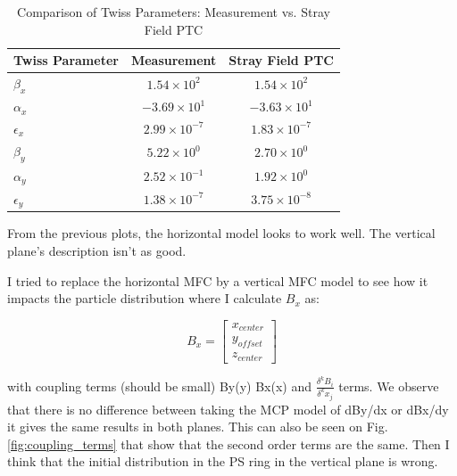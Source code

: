 \begin{table}[ht]
    \centering
    \caption{Comparison of Twiss Parameters: Measurement vs. Stray Field PTC}
    \begin{tabular}{l c c}
        \hline
        \textbf{Twiss Parameter} & \textbf{Measurement} & \textbf{Stray Field PTC} \\
        \hline
        $\beta_x$ & $1.54 \times 10^2$ & $1.54 \times 10^2$ \\
        $\alpha_x$ & $-3.69 \times 10^1$ & $-3.63 \times 10^1$ \\
        $\epsilon_x$ & $2.99 \times 10^{-7}$ & $1.83 \times 10^{-7}$ \\
        \hline
        $\beta_y$ & $5.22 \times 10^0$ & $2.70 \times 10^0$ \\
        $\alpha_y$ & $2.52 \times 10^{-1}$ & $1.92 \times 10^0$ \\
        $\epsilon_y$ & $1.38 \times 10^{-7}$ & $3.75 \times 10^{-8}$ \\
        \hline
    \end{tabular}
    \label{tab:twiss_comparison_measurement_ptc}
\end{table}

From the previous plots, the horizontal model looks to work well. The vertical plane's description isn't as good.

I tried to replace the horizontal MFC by a vertical MFC model to see how it impacts the particle distribution where I calculate $B_{x}$ as:

$$ B_{x} = \begin{bmatrix}  
x_{center} \\  
y_{offset}\\
z_{center} \end{bmatrix} $$

with coupling terms (should be small) By(y) Bx(x) and $\frac{\delta^{k} B_{i}}{\delta^{k} x_{j}}$ terms. We observe that there is no difference between taking the MCP model of dBy/dx or dBx/dy it gives the same results in both planes. This can also be seen on Fig. \ref{fig:coupling_terms} that show that the second order terms are the same. Then I think that the initial distribution in the PS ring in the vertical plane is wrong.

